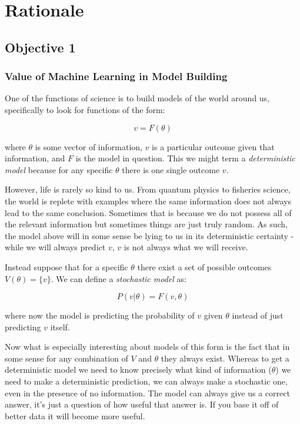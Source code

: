 \documentclass[11pt]{article}
\begin{document}
\newpage


















\section{Rationale}

\subsection{Objective 1} \label{objective1}

\subsubsection{Value of Machine Learning in Model Building}

One of the functions of science is to build models of the world around us, specifically to look for functions of the form:

$$v=F(\theta)$$

where $\theta$ is some vector of information, $v$ is a particular outcome given that information, and $F$ is the model in question. This we might term a \textit{deterministic model} because for any specific $\theta$ there is one single outcome $v$. 

However, life is rarely so kind to us. From quantum physics to fisheries science, the world is replete with examples where the same information does not always lead to the same conclusion. Sometimes that is because we do not possess all of the relevant information but sometimes things are just truly random. As such, the model above will in some sense be lying to us in its deterministic certainty - while we will always predict $v$, $v$ is not always what we will receive. 

Instead suppose that for a specific $\theta$ there exist a set of possible outcomes $V(\theta)=\lbrace v \rbrace$. We can define a \textit{stochastic model} as:

$$P(v|\theta)=F(v, \theta)$$ 

where now the model is predicting the probability of $v$ given $\theta$ instead of just predicting $v$ itself.

Now what is especially interesting about models of this form is the fact that in some sense for any combination of $V$ and $\theta$ they always exist. Whereas to get a deterministic model we need to know precisely what kind of information ($\theta$) we need to make a deterministic prediction, we can always make a stochastic one, even in the presence of no information. The model can always give us a correct answer, it's just a question of how useful that answer is. If you base it off of better data it will become more useful.
\end{document}
